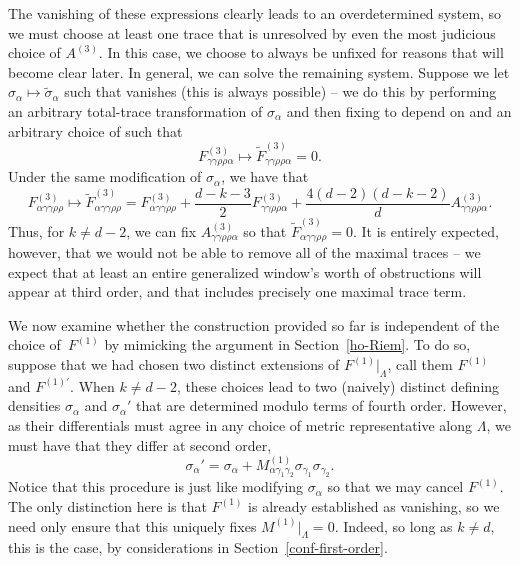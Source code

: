 \documentclass[10pt,a4paper]{article}
\numberwithin{equation}{section}
\renewcommand{\=}{\stackrel \Lambda =}
\begin{document}
The vanishing of these expressions clearly leads to an overdetermined system, so we must choose at least one trace that is unresolved by even the most judicious choice of $A^{(3)}$. In this case, we choose  to always be unfixed for reasons that will become clear later. In general, we can solve the remaining system. Suppose we let $\sigma_{\alpha} \mapsto \tilde{\sigma}_{\alpha}$ such that  vanishes (this is always possible) -- we do this by performing an arbitrary total-trace transformation of $\sigma_{\alpha}$ and then fixing  to depend on  and an arbitrary choice of  such that
\[{F}^{(3)}_{\gamma \gamma \rho \rho \alpha} \mapsto \tilde{F}^{(3)}_{\gamma \gamma \rho \rho \alpha} = 0 .\]
Under the same modification of $\sigma_{\alpha}$, we have that
\[F^{(3)}_{\alpha \gamma \gamma \rho \rho} \mapsto \tilde{F}^{(3)}_{\alpha \gamma \gamma \rho \rho} = F^{(3)}_{\alpha \gamma \gamma \rho \rho} + \frac{d-k-3}{2} F^{(3)}_{\gamma \gamma \rho \rho \alpha} + \frac{4(d-2)(d-k-2)}{d} A^{(3)}_{\gamma \gamma \rho \rho \alpha} .\]
Thus, for $k\neq d-2$, we can fix $A^{(3)}_{\gamma \gamma \rho \rho \alpha}$ so that $\tilde{F}^{(3)}_{\alpha \gamma \gamma \rho \rho} = 0$. It is entirely expected, however, that we would not be able to remove all of the maximal traces -- we expect that at least an entire generalized window's worth of obstructions will appear at third order, and that includes precisely one maximal trace term.

We now examine whether the construction provided so far is independent of the choice of~$F^{(1)}$ by mimicking the argument in Section~\ref{ho-Riem}. To do so, suppose that we had chosen two distinct extensions of $F^{(1)}|_{\Lambda}$, call them $F^{(1)}$ and $F^{(1)'}$. When $k\neq d-2$, these choices lead to two (naively) distinct defining densities $\sigma_{\alpha}$ and $\sigma_{\alpha}'$ that are determined modulo terms of fourth order. However, as their differentials must agree in any choice of metric representative along $\Lambda$, we must have that they differ at second order,
\[\sigma_{\alpha}' = \sigma_{\alpha} + M^{(1)}_{\alpha \gamma_1 \gamma_2} \sigma_{\gamma_1} \sigma_{\gamma_2} .\]
Notice that this procedure is just like modifying $\sigma_{\alpha}$ so that we may cancel $F^{(1)}$. The only distinction here is that $F^{(1)}$ is already established as vanishing, so we need only ensure that this uniquely fixes $M^{(1)}|_{\Lambda} = 0$. Indeed, so long as $k \neq d$, this is the case, by considerations in Section~\ref{conf-first-order}.
\end{document}
